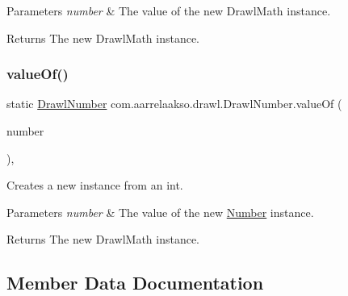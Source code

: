 \begin{DoxyParams}{Parameters}
{\em number} & The value of the new Drawl\+Math instance. \\
\hline
\end{DoxyParams}
\begin{DoxyReturn}{Returns}
The new Drawl\+Math instance. 
\end{DoxyReturn}
\mbox{\label{classcom_1_1aarrelaakso_1_1drawl_1_1_drawl_number_a1d775ac904124b03271461a325a7e232}} 
\subsubsection{\texorpdfstring{value\+Of()}{valueOf()}\hspace{0.1cm}{\footnotesize\ttfamily [5/5]}}
{\footnotesize\ttfamily static \hyperlink{classcom_1_1aarrelaakso_1_1drawl_1_1_drawl_number}{Drawl\+Number} com.\+aarrelaakso.\+drawl.\+Drawl\+Number.\+value\+Of (\begin{DoxyParamCaption}\item[{@Not\+Null final int}]{number }\end{DoxyParamCaption})\hspace{0.3cm}{\ttfamily [static]}, {\ttfamily [package]}}



Creates a new instance from an int. 


\begin{DoxyParams}{Parameters}
{\em number} & The value of the new \hyperlink{interfacecom_1_1aarrelaakso_1_1drawl_1_1_number}{Number} instance. \\
\hline
\end{DoxyParams}
\begin{DoxyReturn}{Returns}
The new Drawl\+Math instance. 
\end{DoxyReturn}


\subsection{Member Data Documentation}
\mbox{\label{classcom_1_1aarrelaakso_1_1drawl_1_1_drawl_number_a1264dfbcaff0b610a0b6a5e5a6b37e72}} 
